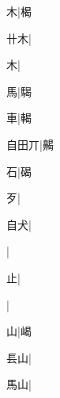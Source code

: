 \begin{multicols}{2}
{{\cjk{}{\cnsym{}　}{\cnsym{}　}木}|{\cjk{}楬}\par
{\cjk{}{\cnsym{}　}卄木}|{}\par
{木}|{}\par
{\cjk{}{\cnsym{}　}{\cnsym{}　}馬}|{\cjk{}騔}\par
{\cjk{}{\cnsym{}　}{\cnsym{}　}車}|{\cjk{}輵}\par
{\cjk{}自田丌}|{\cjk{}齃}\par
{\cjk{}{\cnsym{}　}{\cnsym{}　}石}|{\cjk{}碣}\par
{\cjk{}{\cnsym{}　}{\cnsym{}　}歹}|{}\par
{\cjk{}{\cnsym{}　}自犬}|{}\par
{}|{}\par
{止}|{}\par
{}|{}\par
{\cjk{}{\cnsym{}　}{\cnsym{}　}山}|{\cjk{}嵑}\par
{\cjk{}{\cnsym{}　}镸山}|{}\par
{\cjk{}{\cnsym{}　}馬山}|{}\par
}
\end{multicols}
